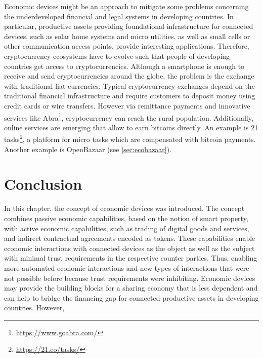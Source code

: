 Economic devices might be an approach to mitigate some problems concerning the underdeveloped financial and legal systems in developing countries. In particular, productive assets providing foundational infrastructure for connected devices, such as solar home systems and micro utilities, as well as small cells or other communication access points, provide interesting applications. Therefore, cryptocurrency ecosystems have to evolve such that people of developing countries get access to cryptocurrencies. Although a smartphone is enough to receive and send cryptocurrencies around the globe, the problem is the exchange with traditional fiat currencies. Typical cryptocurrency exchanges depend on the traditional financial infrastructure and require customers to deposit money using credit cards or wire transfers. However via remittance payments and innovative services like Abra\footnote{\url{https://www.goabra.com/}}, cryptocurrency can reach the rural population. Additionally, online services are emerging that allow to earn bitcoins directly. An example is 21 tasks\footnote{\url{https://21.co/tasks/}}, a platform for micro tasks which are compensated with bitcoin payments. Another example is OpenBazaar (see \ref{sec:ecobazaar}). 


\section{Conclusion}

In this chapter, the concept of economic devices was introduced. The concept combines passive economic capabilities, based on the notion of smart property, with active economic capabilities, such as trading of digital goods and services, and indirect contractual agreements encoded as tokens. These capabilities enable economic interactions with connected devices as the object as well as the subject with minimal trust requirements in the respective counter parties. Thus, enabling more automated economic interactions and new types of interactions that were not possible before because trust requirements were inhibiting. Economic devices may provide the building blocks for a sharing economy that is less dependent  and can help to bridge the financing gap for connected productive assets in developing countries. However, 